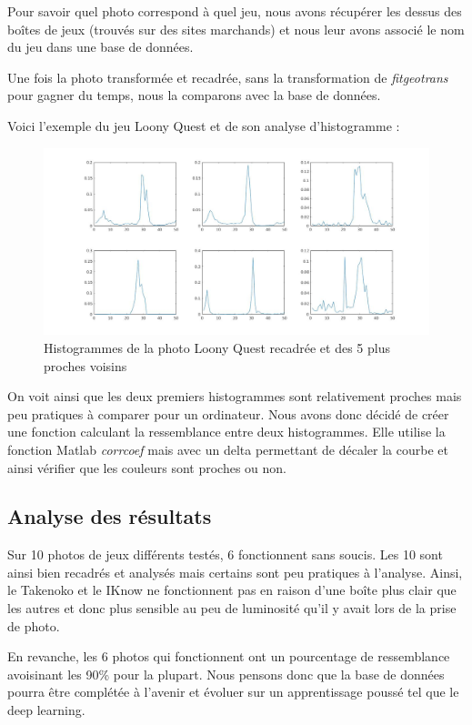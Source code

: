 \documentclass{st50_template}
\begin{document}
Pour savoir quel photo correspond à quel jeu, nous avons récupérer les dessus des boîtes de jeux (trouvés sur des sites marchands) et nous leur avons associé le nom du jeu dans une base de données.

Une fois la photo transformée et recadrée, sans la transformation de \emph{fitgeotrans} pour gagner du temps, nous la comparons avec la base de données.

Voici l'exemple du jeu Loony Quest et de son analyse d'histogramme :

\begin{figure}[ht]
    \centering
    \includegraphics[width=\textwidth]{images/graphLoonyQuest.jpg}
    \caption{Histogrammes de la photo Loony Quest recadrée et des 5 plus proches voisins}
    \label{loonyQuest}
\end{figure}

On voit ainsi que les deux premiers histogrammes sont relativement proches mais peu pratiques à comparer pour un ordinateur. Nous avons donc décidé de créer une fonction calculant la ressemblance entre deux histogrammes. Elle utilise la fonction Matlab \emph{corrcoef} mais avec un delta permettant de décaler la courbe et ainsi vérifier que les couleurs sont proches ou non.

\subsection{Analyse des résultats}

Sur 10 photos de jeux différents testés, 6 fonctionnent sans soucis. Les 10 sont ainsi bien recadrés et analysés mais certains sont peu pratiques à l'analyse. Ainsi, le Takenoko et le IKnow ne fonctionnent pas en raison d'une boîte plus clair que les autres et donc plus sensible au peu de luminosité qu'il y avait lors de la prise de photo.

En revanche, les 6 photos qui fonctionnent ont un pourcentage de ressemblance avoisinant les 90\% pour la plupart. Nous pensons donc que la base de données pourra être complétée à l'avenir et évoluer sur un apprentissage poussé tel que le deep learning.
\end{document}
